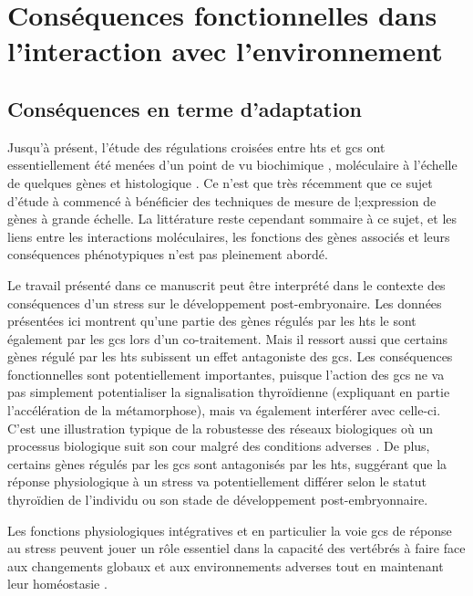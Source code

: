 \documentclass[../main.tex]{subfiles}
\begin{document}
\chapter{Conséquences fonctionnelles dans l'interaction avec l'environnement}


\section{Conséquences en terme d'adaptation}

Jusqu'à présent, l'étude des régulations croisées entre \glspl{ht} et \glspl{gc} ont essentiellement été menées d'un point de vu biochimique \citep{Kikuyama1982,Galton1990}, moléculaire à l’échelle de quelques gènes \citep{Bagamasbad2008,Krain2004} et histologique \citep{Denver1993}.
Ce n’est que très récemment que ce sujet d'étude à commencé à bénéficier des techniques de mesure de l;expression de gènes à grande échelle.
La littérature reste cependant sommaire à ce sujet, et les liens entre les interactions moléculaires, les fonctions des gènes associés et leurs conséquences phénotypiques n'est pas pleinement abordé.
\par
Le travail présenté dans ce manuscrit peut être interprété dans le contexte des conséquences d'un stress sur le développement post-embryonaire.
Les données présentées ici montrent qu'une partie des gènes régulés par les \glspl{ht} le sont également par les \glspl{gc} lors d'un co-traitement.
Mais il ressort aussi que certains gènes régulé par les \glspl{ht} subissent un effet antagoniste des \glspl{gc}.
Les conséquences fonctionnelles sont potentiellement importantes, puisque l'action des \glspl{gc} ne va pas simplement potentialiser la signalisation thyroïdienne (expliquant en partie l'accélération de la métamorphose), mais va également interférer avec celle-ci.
C'est une illustration typique de la robustesse des réseaux biologiques où un processus biologique suit son cour malgré des conditions adverses \citep{Kitano2004}.
De plus, certains gènes régulés par les \glspl{gc} sont antagonisés par les \glspl{ht}, suggérant que la réponse physiologique à un stress va potentiellement différer selon le statut thyroïdien de l'individu ou son stade de développement post-embryonnaire.
\par
Les fonctions physiologiques intégratives et en particulier la voie \glspl{gc} de réponse au stress peuvent jouer un rôle essentiel dans la capacité des vertébrés à faire face aux changements globaux et aux environnements adverses tout en maintenant leur homéostasie \citep{Angelier2013}.
\end{document}
